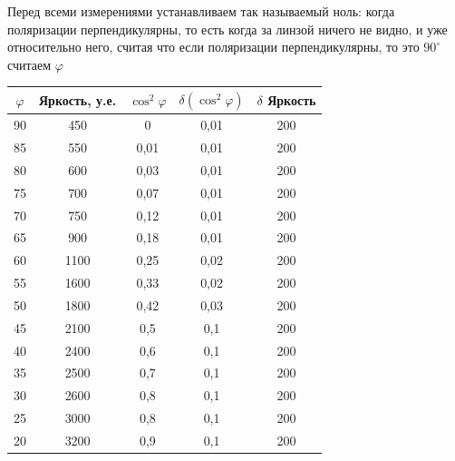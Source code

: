 \documentclass[a4paper, 12pt]{article}%
\begin{document}
\begin{enumerate}
Перед всеми измерениями устанавливаем так называемый ноль: когда поляризации перпендикулярны, то есть когда за линзой ничего не видно, и уже относительно него, считая что если поляризации перпендикулярны, то это $90^{\circ}$ считаем $\varphi$
\begin{table}[h]
\begin{center}
\begin{tabular}{|c|c|c|c|c|}
\hline
$\varphi$ & Яркость, у.е. & $\cos^2\varphi$ & $\delta(\cos^2\varphi)$ & $\delta$ Яркость \\ \hline
90        & 450           & 0               & 0,01                    & 200              \\ \hline
85        & 550           & 0,01            & 0,01                    & 200              \\ \hline
80        & 600           & 0,03            & 0,01                    & 200              \\ \hline
75        & 700           & 0,07            & 0,01                    & 200              \\ \hline
70        & 750           & 0,12            & 0,01                    & 200              \\ \hline
65        & 900           & 0,18            & 0,01                    & 200              \\ \hline
60        & 1100          & 0,25            & 0,02                    & 200              \\ \hline
55        & 1600          & 0,33            & 0,02                    & 200              \\ \hline
50        & 1800          & 0,42            & 0,03                    & 200              \\ \hline
45        & 2100          & 0,5             & 0,1                     & 200              \\ \hline
40        & 2400          & 0,6             & 0,1                     & 200              \\ \hline
35        & 2500          & 0,7             & 0,1                     & 200              \\ \hline
30        & 2600          & 0,8             & 0,1                     & 200              \\ \hline
25        & 3000          & 0,8             & 0,1                     & 200              \\ \hline
20        & 3200          & 0,9             & 0,1                     & 200              \\ \hline

\end{tabular}
\end{center}
\end{table}
\end{enumerate}
\end{document}
